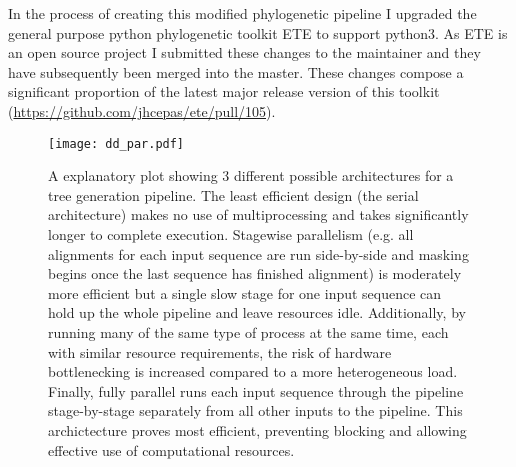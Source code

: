 In the process of creating this modified phylogenetic pipeline I upgraded the general purpose python phylogenetic toolkit
ETE \citep{Huerta-Cepas2010} to support python3.  As ETE is an open source project I submitted these changes
to the maintainer and they have subsequently been merged into the master.  These changes compose a significant proportion of
the latest major release version of this toolkit (\url{https://github.com/jhcepas/ete/pull/105}).

\begin{figure}[h!]
    \texttt{[image: dd\_par.pdf]}
    \caption[Tree generation pipeline architectures]{A explanatory plot showing 3 different possible architectures for a tree generation pipeline. 
    The least efficient design (the serial architecture) 
    makes no use of multiprocessing and takes significantly longer to complete
    execution. Stagewise parallelism (e.g. all alignments for each input sequence are run side-by-side and masking begins once the last sequence has finished alignment) is moderately
    more efficient but a single
        slow stage for one input sequence can hold up the whole pipeline and leave resources idle.  Additionally,
        by running many of the same type of process at the same time, each with similar resource requirements,
        the risk of hardware bottlenecking is increased compared to a more heterogeneous load.
        Finally, fully parallel runs each input sequence through the pipeline stage-by-stage separately
    from all other inputs to the pipeline. This archictecture proves most efficient, preventing blocking and allowing effective use of computational resources.}
    \label{fig:ddg}
\end{figure}

